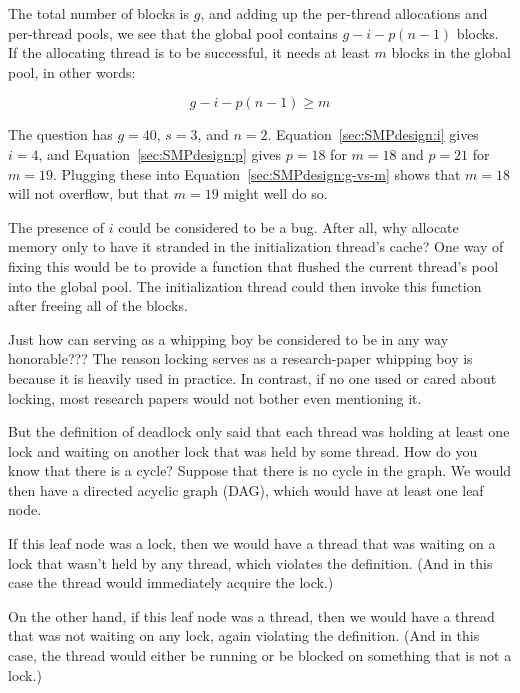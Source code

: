 	The total number of blocks is $g$, and adding up the per-thread
	allocations and per-thread pools, we see that the global pool
	contains $g-i-p(n-1)$ blocks.
	If the allocating thread is to be successful, it needs at least
	$m$ blocks in the global pool, in other words:

	\begin{equation}
		g - i - p(n - 1) \ge m
	\label{sec:SMPdesign:g-vs-m}
	\end{equation}

	The question has $g=40$, $s=3$, and $n=2$.
	Equation~\ref{sec:SMPdesign:i} gives $i=4$, and
	Equation~\ref{sec:SMPdesign:p} gives $p=18$ for $m=18$
	and $p=21$ for $m=19$.
	Plugging these into Equation~\ref{sec:SMPdesign:g-vs-m}
	shows that $m=18$ will not overflow, but that $m=19$ might
	well do so.

	The presence of $i$ could be considered to be a bug.
	After all, why allocate memory only to have it stranded in
	the initialization thread's cache?
	One way of fixing this would be to provide a 
	function that flushed the current thread's pool into the
	global pool.
	The initialization thread could then invoke this function
	after freeing all of the blocks.

\QuickQ{}
	Just how can serving as a whipping boy be considered to be
	in any way honorable???
\QuickA{}
	The reason locking serves as a research-paper whipping boy is
	because it is heavily used in practice.
	In contrast, if no one used or cared about locking, most research
	papers would not bother even mentioning it.

\QuickQ{}
	But the definition of deadlock only said that each thread
	was holding at least one lock and waiting on another lock
	that was held by some thread.
	How do you know that there is a cycle?
\QuickA{}
	Suppose that there is no cycle in the graph.
	We would then have a directed acyclic graph (DAG), which would
	have at least one leaf node.

	If this leaf node was a lock, then we would have a thread
	that was waiting on a lock that wasn't held by any thread,
	which violates the definition.
	(And in this case the thread would immediately acquire the
	lock.)

	On the other hand, if this leaf node was a thread, then
	we would have a thread that was not waiting on any lock,
	again violating the definition.
	(And in this case, the thread would either be running or
	be blocked on something that is not a lock.)

